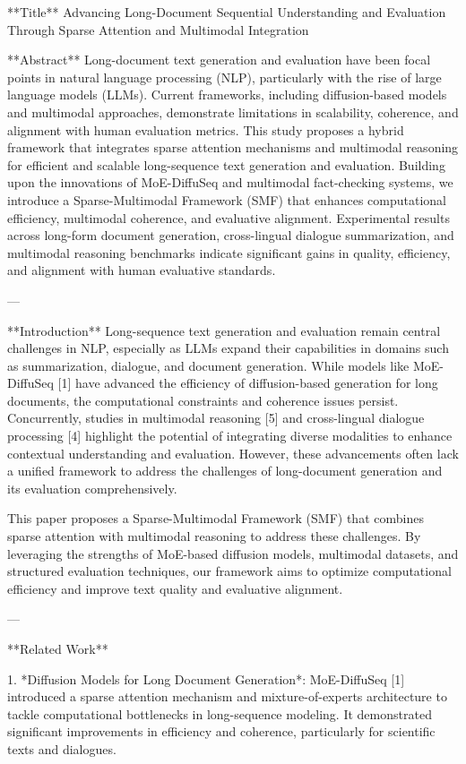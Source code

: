 **Title**  
Advancing Long-Document Sequential Understanding and Evaluation Through Sparse Attention and Multimodal Integration  

**Abstract**  
Long-document text generation and evaluation have been focal points in natural language processing (NLP), particularly with the rise of large language models (LLMs). Current frameworks, including diffusion-based models and multimodal approaches, demonstrate limitations in scalability, coherence, and alignment with human evaluation metrics. This study proposes a hybrid framework that integrates sparse attention mechanisms and multimodal reasoning for efficient and scalable long-sequence text generation and evaluation. Building upon the innovations of MoE-DiffuSeq and multimodal fact-checking systems, we introduce a Sparse-Multimodal Framework (SMF) that enhances computational efficiency, multimodal coherence, and evaluative alignment. Experimental results across long-form document generation, cross-lingual dialogue summarization, and multimodal reasoning benchmarks indicate significant gains in quality, efficiency, and alignment with human evaluative standards.  

---

**Introduction**  
Long-sequence text generation and evaluation remain central challenges in NLP, especially as LLMs expand their capabilities in domains such as summarization, dialogue, and document generation. While models like MoE-DiffuSeq [1] have advanced the efficiency of diffusion-based generation for long documents, the computational constraints and coherence issues persist. Concurrently, studies in multimodal reasoning [5] and cross-lingual dialogue processing [4] highlight the potential of integrating diverse modalities to enhance contextual understanding and evaluation. However, these advancements often lack a unified framework to address the challenges of long-document generation and its evaluation comprehensively.

This paper proposes a Sparse-Multimodal Framework (SMF) that combines sparse attention with multimodal reasoning to address these challenges. By leveraging the strengths of MoE-based diffusion models, multimodal datasets, and structured evaluation techniques, our framework aims to optimize computational efficiency and improve text quality and evaluative alignment.  

---

**Related Work**  

1. *Diffusion Models for Long Document Generation*: MoE-DiffuSeq [1] introduced a sparse attention mechanism and mixture-of-experts architecture to tackle computational bottlenecks in long-sequence modeling. It demonstrated significant improvements in efficiency and coherence, particularly for scientific texts and dialogues.  

